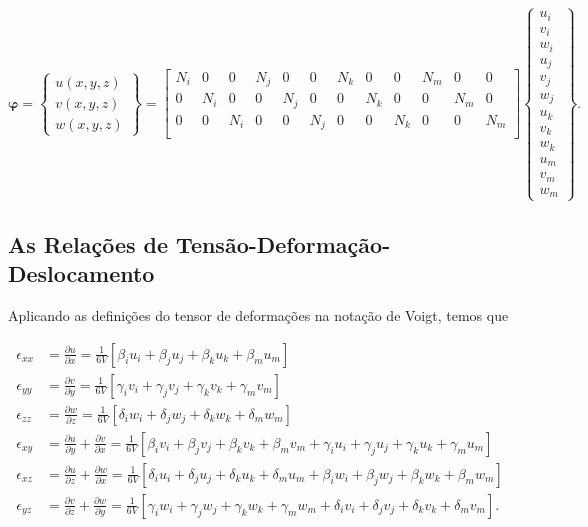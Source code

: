 \begin{equation}
    \bm{\varphi} = \begin{Bmatrix}
        u(x,y,z) \\
        v(x,y,z) \\
        w(x,y,z)
    \end{Bmatrix} = 
    \begin{bmatrix}
        N_i & 0   & 0   & N_j & 0   & 0   & N_k & 0   & 0   & N_m & 0   & 0 \\
        0   & N_i & 0   & 0   & N_j & 0   & 0   & N_k & 0   & 0   & N_m & 0 \\
        0   & 0   & N_i & 0   & 0   & N_j & 0   & 0   & N_k & 0   & 0   & N_m \\
    \end{bmatrix}
    \begin{Bmatrix}
        u_i \\ v_i \\ w_i \\ u_j \\ v_j \\ w_j \\ u_k \\ v_k \\ w_k \\ u_m \\ v_m \\ w_m
    \end{Bmatrix}.
\end{equation}

\subsection{As Relações de Tensão-Deformação-Deslocamento}

Aplicando as definições do tensor de deformações na notação de Voigt, temos que

\begin{align}
    \epsilon_{xx} &= \frac{\partial u}{\partial x} = \frac{1}{6V}[\beta_i u_i + \beta_j u_j + \beta_k u_k + \beta_m u_m] \\
    \epsilon_{yy} &= \frac{\partial v}{\partial y} = \frac{1}{6V}[\gamma_i v_i + \gamma_j v_j + \gamma_k v_k + \gamma_m v_m] \\
    \epsilon_{zz} &= \frac{\partial w}{\partial z} = \frac{1}{6V}[\delta_i w_i + \delta_j w_j + \delta_k w_k + \delta_m w_m] \\
    \epsilon_{xy} &= \frac{\partial u}{\partial y} + \frac{\partial v}{\partial x} = \frac{1}{6V}[\beta_i v_i + \beta_j v_j + \beta_k v_k + \beta_m v_m + \gamma_i u_i + \gamma_j u_j + \gamma_k u_k + \gamma_m u_m] \\
    \epsilon_{xz} &= \frac{\partial u}{\partial z} + \frac{\partial w}{\partial x} = \frac{1}{6V}[\delta_i u_i + \delta_j u_j + \delta_k u_k + \delta_m u_m + \beta_i w_i + \beta_j w_j + \beta_k w_k + \beta_m w_m] \\
    \epsilon_{yz} &= \frac{\partial v}{\partial z} + \frac{\partial w}{\partial y} = \frac{1}{6V}[\gamma_i w_i + \gamma_j w_j + \gamma_k w_k + \gamma_m w_m + \delta_i v_i + \delta_j v_j + \delta_k v_k + \delta_m v_m].
\end{align}

